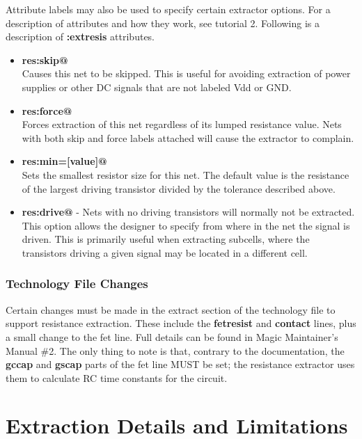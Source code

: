 \documentclass[letterpaper,twoside,12pt]{article}
\begin{document}
Attribute labels may also be used to specify certain extractor options.  For
a description of attributes and how they work, see tutorial 2.  Following is
a description of {\bfseries :extresis} attributes.

\begin{itemize}
   \item {\bfseries res:skip@} \\
	Causes this net to be skipped.  This is useful for avoiding
	extraction of power supplies or other DC signals that are not
	labeled Vdd or GND.

   \item {\bfseries res:force@} \\
	Forces extraction of this net regardless of its lumped
	resistance value.  Nets with both skip and force labels attached
	will cause the extractor to complain.

   \item {\bfseries res:min=[value]@} \\ Sets the smallest resistor size
	for this net.  The default value is the resistance of the largest
	driving transistor divided by the tolerance described above.

   \item {\bfseries res:drive@} - Nets with no driving transistors will normally
	not be extracted.  This option allows the designer to specify from
	where in the net the signal is driven.  This is primarily useful
	when extracting subcells, where the transistors driving a given signal
	may be located in a different cell.
\end{itemize}

\subsubsection{Technology File Changes}

Certain changes must be made in the extract section of the technology file
to support resistance extraction.  These include the {\bfseries fetresist} and {\bfseries contact}
lines, plus a small change to the fet line. Full details can be found in
Magic Maintainer's Manual \#2.  The only thing to note is that, contrary to
the documentation, the {\bfseries gccap} and {\bfseries gscap} parts of the fet line MUST 
be set; the resistance extractor uses them to calculate RC time constants for
the circuit.

\section{Extraction Details and Limitations}
\end{document}
